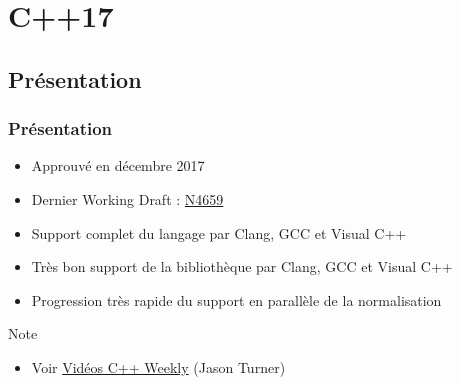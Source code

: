 \documentclass[C++.tex]{subfiles}
\begin{document}
\section{C++17}
\subsection*{Présentation}
\begin{frame}
	\frametitle{Présentation}
	\begin{itemize}
		\item Approuvé en décembre 2017
		\item Dernier Working Draft : \href{http://www.open-std.org/jtc1/sc22/wg21/docs/papers/2017/n4659.pdf}{N4659}
		\item Support complet du langage par Clang, GCC et Visual C++
		\item Très bon support de la bibliothèque par Clang, GCC et Visual C++


		\item Progression très rapide du support en parallèle de la normalisation
	\end{itemize}

	\begin{block}{Note}
		\begin{itemize}
			\item Voir \href{https://www.youtube.com/user/lefticus1/videos}{Vidéos C++ Weekly} (Jason Turner)
		\end{itemize}
	\end{block}
\end{frame}
\end{document}
